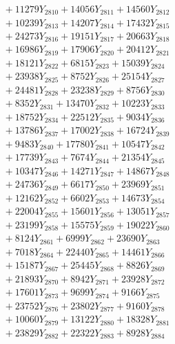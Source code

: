 \documentclass[a4paper,10pt]{article}
\begin{document}
{\begin{align}
&\;  + 11279 Y_{2810} + 14056 Y_{2811} + 14560 Y_{2812} \\[0.3ex]
&\;  + 10239 Y_{2813} + 14207 Y_{2814} + 17432 Y_{2815} \\[0.3ex]
&\;  + 24273 Y_{2816} + 19151 Y_{2817} + 20663 Y_{2818} \\[0.5ex]\allowbreak
&\;  + 16986 Y_{2819} + 17906 Y_{2820} + 20412 Y_{2821} \\[0.3ex]
&\;  + 18121 Y_{2822} + 6815 Y_{2823} + 15039 Y_{2824} \\[0.3ex]
&\;  + 23938 Y_{2825} + 8752 Y_{2826} + 25154 Y_{2827} \\[0.3ex]
&\;  + 24481 Y_{2828} + 23238 Y_{2829} + 8756 Y_{2830} \\[0.3ex]
&\;  + 8352 Y_{2831} + 13470 Y_{2832} + 10223 Y_{2833} \\[0.3ex]
&\;  + 18752 Y_{2834} + 22512 Y_{2835} + 9034 Y_{2836} \\[0.3ex]
&\;  + 13786 Y_{2837} + 17002 Y_{2838} + 16724 Y_{2839} \\[0.3ex]
&\;  + 9483 Y_{2840} + 17780 Y_{2841} + 10547 Y_{2842} \\[0.3ex]
&\;  + 17739 Y_{2843} + 7674 Y_{2844} + 21354 Y_{2845} \\[0.3ex]
&\;  + 10347 Y_{2846} + 14271 Y_{2847} + 14867 Y_{2848} \\[0.5ex]\allowbreak
&\;  + 24736 Y_{2849} + 6617 Y_{2850} + 23969 Y_{2851} \\[0.3ex]
&\;  + 12162 Y_{2852} + 6602 Y_{2853} + 14673 Y_{2854} \\[0.3ex]
&\;  + 22004 Y_{2855} + 15601 Y_{2856} + 13051 Y_{2857} \\[0.3ex]
&\;  + 23199 Y_{2858} + 15575 Y_{2859} + 19022 Y_{2860} \\[0.3ex]
&\;  + 8124 Y_{2861} + 6999 Y_{2862} + 23690 Y_{2863} \\[0.3ex]
&\;  + 7018 Y_{2864} + 22440 Y_{2865} + 14461 Y_{2866} \\[0.3ex]
&\;  + 15187 Y_{2867} + 25445 Y_{2868} + 8826 Y_{2869} \\[0.3ex]
&\;  + 21893 Y_{2870} + 8942 Y_{2871} + 23928 Y_{2872} \\[0.3ex]
&\;  + 17601 Y_{2873} + 9699 Y_{2874} + 9166 Y_{2875} \\[0.3ex]
&\;  + 23752 Y_{2876} + 23802 Y_{2877} + 9160 Y_{2878} \\[0.5ex]\allowbreak
&\;  + 10060 Y_{2879} + 13122 Y_{2880} + 18328 Y_{2881} \\[0.3ex]
&\;  + 23829 Y_{2882} + 22322 Y_{2883} + 8928 Y_{2884} \\[0.3ex]

\end{align}}
\end{document}
